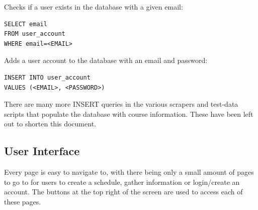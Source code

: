 \documentclass[twoside=false,a4paper,11pt]{article}
\theoremstyle{mytheor}
\begin{document}
Checks if a user exists in the database with a given email:
\begin{lstlisting}
SELECT email
FROM user_account
WHERE email=<EMAIL>
\end{lstlisting}

Adds a user account to the database with an email and password:
\begin{lstlisting}
INSERT INTO user_account
VALUES (<EMAIL>, <PASSWORD>)
\end{lstlisting}

There are many more INSERT queries in the various scrapers and test-data scripts that populate the database with course information. These have been left out to shorten this document.

\subsection*{User Interface}

Every page is easy to navigate to, with there being only a small amount of pages to go to for users to create a schedule, gather information or login/create an account. The buttons at the top right of the screen are used to access each of these pages.
\end{document}
